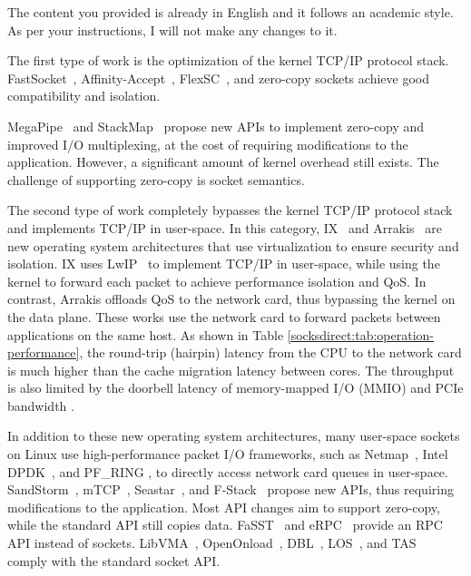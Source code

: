 The content you provided is already in English and it follows an academic style. As per your instructions, I will not make any changes to it.

The first type of work is the optimization of the kernel TCP/IP protocol stack. FastSocket~\cite{lin2016scalable}, Affinity-Accept~\cite{pesterev2012improving}, FlexSC~\cite{soares2010flexsc}, and zero-copy sockets \cite{thadani1995efficient,chu1996zero,linux-zero-copy} achieve good compatibility and isolation.

MegaPipe~\cite{han2012megapipe} and StackMap~\cite{yasukata2016stackmap} propose new APIs to implement zero-copy and improved I/O multiplexing, at the cost of requiring modifications to the application. However, a significant amount of kernel overhead still exists. The challenge of supporting zero-copy is socket semantics.

The second type of work completely bypasses the kernel TCP/IP protocol stack and implements TCP/IP in user-space. In this category, IX~\cite{belay2017ix} and Arrakis~\cite{peter2016arrakis} are new operating system architectures that use virtualization to ensure security and isolation. IX uses LwIP~\cite{dunkels2001design} to implement TCP/IP in user-space, while using the kernel to forward each packet to achieve performance isolation and QoS. In contrast, Arrakis offloads QoS to the network card, thus bypassing the kernel on the data plane. These works use the network card to forward packets between applications on the same host. As shown in Table \ref{socksdirect:tab:operation-performance}, the round-trip (hairpin) latency from the CPU to the network card is much higher than the cache migration latency between cores. The throughput is also limited by the doorbell latency of memory-mapped I/O (MMIO) and PCIe bandwidth \cite{neugebauer2018understanding,li2017kv}.

In addition to these new operating system architectures, many user-space sockets on Linux use high-performance packet I/O frameworks, such as Netmap~\cite{rizzo2012netmap}, Intel DPDK~\cite{dpdk}, and PF_RING \cite{pf-ring}, to directly access network card queues in user-space. SandStorm~\cite{marinos2014network}, mTCP~\cite{jeong2014mtcp}, Seastar~\cite{seastar}, and F-Stack~\cite{fstack} propose new APIs, thus requiring modifications to the application. Most API changes aim to support zero-copy, while the standard API still copies data. FaSST~\cite{kalia2016fasst} and eRPC~\cite{kalia2018datacenter} provide an RPC API instead of sockets. LibVMA~\cite{libvma}, OpenOnload~\cite{openonload}, DBL~\cite{dbl}, LOS~\cite{huang2017high}, and TAS~\cite{taseurosys19} comply with the standard socket API.


